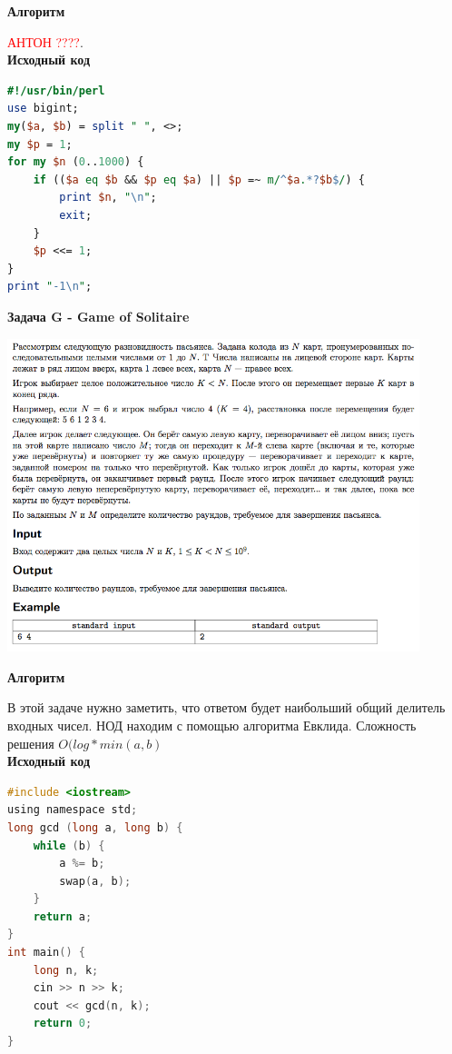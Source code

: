 \documentclass[a4paper,12pt]{article}
\begin{document}
\textbf{{\large Алгоритм}}

\textcolor{red}{\Huge{АНТОН ????}}. \\


\textbf{{\large Исходный код}} \\
\begin{lstlisting}[language=Perl]
#!/usr/bin/perl
use bigint;
my($a, $b) = split " ", <>;
my $p = 1;
for my $n (0..1000) {
	if (($a eq $b && $p eq $a) || $p =~ m/^$a.*?$b$/) {
		print $n, "\n";
		exit;
	}
	$p <<= 1;
}
print "-1\n";
\end{lstlisting}


\newpage
\textbf{{\large Задача G - Game of Solitaire}}

\begin{center}
\includegraphics[width=0.9\textwidth]{OC_Ukraine/G.png}\\ [1cm]
\end{center}

\textbf{{\large Алгоритм}}

В этой задаче нужно заметить, что ответом будет наибольший общий делитель входных чисел. НОД находим с помощью алгоритма Евклида. Сложность решения $O(log * min(a, b)$ \\


\textbf{{\large Исходный код}} \\
\begin{lstlisting}[language=C]
#include <iostream>
using namespace std;
long gcd (long a, long b) {
    while (b) {
        a %= b;
        swap(a, b);
    }
    return a;
}
int main() {
    long n, k;
    cin >> n >> k;
    cout << gcd(n, k);
    return 0;
}
\end{lstlisting}
\end{document}
